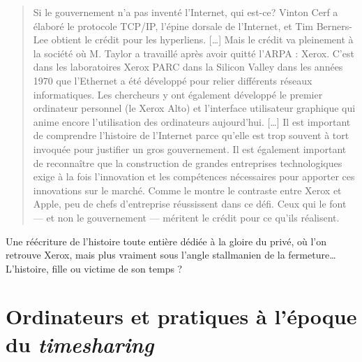 \documentclass{FramateX}
\begin{document}
\begin{refsection}
\begin{quote}
Si le gouvernement n'a pas inventé
l'Internet, qui est-ce? Vinton Cerf a élaboré le
protocole TCP/IP, l'épine dorsale de
l'Internet, et Tim Berners-Lee obtient le crédit pour
les hyperliens. [\ldots] Mais le crédit va pleinement à la société où M.
Taylor a travaillé après avoir quitté l'ARPA : Xerox.
C'est dans les laboratoires Xerox PARC dans la Silicon
Valley dans les années 1970 que l'Ethernet a été
développé pour relier différents réseaux informatiques. Les chercheurs
y ont également développé le premier ordinateur personnel (le Xerox
Alto) et l'interface utilisateur graphique qui anime
encore l'utilisation des ordinateurs
aujourd'hui. [\ldots] Il est important de comprendre
l'histoire de l'Internet parce
qu'elle est trop souvent à tort invoquée pour
justifier un gros gouvernement. Il est également important de
reconnaître que la construction de grandes entreprises technologiques
exige à la fois l'innovation et les compétences
nécessaires pour apporter ces innovations sur le marché. Comme le
montre le contraste entre Xerox et Apple, peu de chefs
d'entreprise réussissent dans ce défi. Ceux qui le
font — et non le gouvernement — méritent le crédit pour ce
qu'ils
réalisent.
\end{quote}

Une réécriture de l'histoire toute
entière dédiée à la gloire du privé, où l'on retrouve
Xerox, mais plus vraiment sous l'angle stallmanien de
la fermeture\ldots L'histoire, fille ou victime de son
temps ? 

\nocite{beltranhistoire2007,bygraveinternet2009,denardisopening2011,
flichyimaginaire2001,goldsmithwho2006,lecrosniernautralite2011,
musianimodeinternet2011,quatermanmatrix1989,salusquarter1994,
vanschewickinternet2010}








\printbibliography[heading=subbibliography]
\end{refsection}


\chapter*{Ordinateurs et pratiques à l'époque du \textit{timesharing}}
{}
\end{document}
